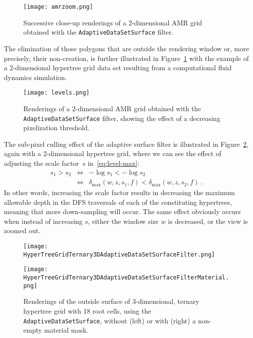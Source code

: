 \begin{figure}[ht!]
\centering
\begin{minipage}[t]{0.99\columnwidth}
\texttt{[image: amrzoom.png]}
\end{minipage}
\caption{Successive close-up renderings of a $2$-dimensional AMR
grid obtained with the \texttt{AdaptiveDataSetSurface} filter.}
\label{fig:AMRZoom}
\end{figure}
The elimination of those polygons that are outside the rendering
window or, more precisely, their non-creation, is further illustrated
in Figure~\ref{fig:AMRZoom} with the example of a $2$-dimensional
hypertree grid data set resulting from a computational fluid dynamics
simulation.

\begin{figure}[ht!]
\centering
\begin{minipage}[t]{0.99\columnwidth}
\texttt{[image: levels.png]}
\end{minipage}
\caption{Renderings of a $2$-dimensional AMR grid obtained with the
\texttt{AdaptiveDataSetSurface} filter, showing the effect of a
decreasing pixelization threshold.} 
\label{fig:levels}
\end{figure}
The sub-pixel culling effect of the adaptive surface filter is
illustrated in Figure~\ref{fig:levels}, again with a $2$-dimensional
hypertree grid, where we can see the effect of adjusting the scale
factor~$s$ in~\eqref{eq:level-max}:
\begin{eqnarray*}
s_1 > s_2 & \Leftrightarrow & - \log{s_1} < - \log{s_2} \\
 & \Leftrightarrow & \delta_{\max}(w,z,s_1,f) <
\delta_{\max}(w,z,s_2,f)\ .
\end{eqnarray*}
In other words, increasing the scale factor results in decreasing the
maximum allowable depth in the DFS traversals of each of the
constituting hypertrees, meaning that more down-sampling will occur.
The same effect obviously occurs when instead of increasing $s$,
either the window size $w$ is decreased, or the view is zoomed out.
\begin{figure}[h!]
\centering
\begin{minipage}[t]{0.48\columnwidth}
\centering
\vspace{0pt}
\texttt{[image: HyperTreeGridTernary3DAdaptiveDataSetSurfaceFilter.png]}
\end{minipage}
\hfil
\begin{minipage}[t]{0.48\columnwidth}
\centering
\vspace{0pt}
\texttt{[image: HyperTreeGridTernary3DAdaptiveDataSetSurfaceFilterMaterial.png]}
\end{minipage}
\caption{Renderings of the outside surface of $3$-dimensional, ternary
hypertree grid with 18 root cells, using the
\texttt{AdaptiveDataSetSurface}, without (left) or with (right) a non-empty
material mask.}
\label{fig:HyperTreeGridTernary3DAdaptiveDataSetSurfaceFilter}
\end{figure}

